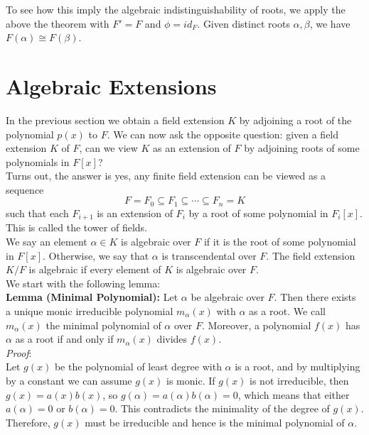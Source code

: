 \documentclass[11pt]{article}
\begin{document}
To see how this imply the algebraic indistinguishability of roots, we apply the above the theorem with $F'=F$ and $\phi=id_F$. Given distinct roots $\alpha, \beta$, we have $F(\alpha) \cong F(\beta)$. 

\section{Algebraic Extensions}

In the previous section we obtain a field extension $K$ by adjoining a root of the polynomial $p(x)$ to $F$. We can now ask the opposite question: given a field extension $K$ of $F$, can we view $K$ as an extension of $F$ by adjoining roots of some polynomials in $F[x]$?\\

Turns out, the answer is yes, any finite field extension can be viewed as a sequence 
\[F=F_0 \subseteq F_1 \subseteq \cdots \subseteq F_n = K\]
such that each $F_{i+1}$ is an extension of $F_i$ by a root of some polynomial in $F_i[x]$. This is called the tower of fields.\\

We say an element $\alpha\in K$ is algebraic over $F$ if it is the root of some polynomial in $F[x]$. Otherwise, we say that $\alpha$ is transcendental over $F$. The field extension $K/F$ is algebraic if every element of $K$ is algebraic over $F$.\\

We start with the following lemma:\\

\textbf{Lemma (Minimal Polynomial):} Let $\alpha$ be algebraic over $F$. Then there exists a unique monic irreducible polynomial $m_{\alpha}(x)$ with $\alpha$ as a root. We call $m_{\alpha}(x)$ the minimal polynomial of $\alpha$ over $F$. Moreover, a polynomial $f(x)$ has $\alpha$ as a root if and only if $m_{\alpha}(x)$ divides $f(x)$.\\

\textit{Proof}:\\
Let $g(x)$ be the polynomial of least degree with $\alpha$ is a root, and by multiplying by a constant we can assume $g(x)$ is monic. If $g(x)$ is not irreducible, then $g(x)=a(x)b(x)$, so $g(\alpha)=a(\alpha)b(\alpha)=0$, which means that either $a(\alpha)=0$ or $b(\alpha)=0$. This contradicts the minimality of the degree of $g(x)$. Therefore, $g(x)$ must be irreducible and hence is the minimal polynomial of $\alpha$.\\
\end{document}
